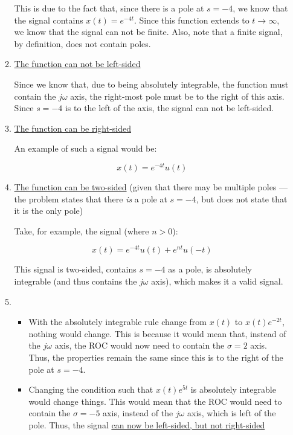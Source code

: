 \begin{enumerate}
\begin{enumerate}
        This is due to the fact that, since there is a pole at $s=-4$, we know that the signal contains $x(t)=e^{-4t}$. Since this function extends to $t\to\infty$, we know that the signal can not be finite. Also, note that a finite signal, by definition, does not contain poles.

      \item \underline{The function can not be left-sided}

        Since we know that, due to being absolutely integrable, the function must contain the $j \omega$ axis, the right-most pole must be to the right of this axis. Since $s=-4$ is to the left of the axis, the signal can not be left-sided.

      \item \underline{The function can be right-sided}

        An example of such a signal would be:

        $$\boxed{x(t)=e^{-4t}u(t)}$$

      \item \underline{The function can be two-sided} (given that there may be multiple poles — the problem states that there \textit{is} a pole at $s=-4$, but does not state that it is the only pole)

        Take, for example, the signal (where $n>0$):

        $$x(t)=e^{-4t}u(t)+e^{nt}u(-t)$$

        This signal is two-sided, contains $s=-4$ as a pole, is absolutely integrable (and thus contains the $j\omega$ axis), which makes it a valid signal.

      \item 

        \begin{itemize}

          \item With the absolutely integrable rule change from $x(t)$ to $x(t)e^{-2t}$, nothing would change. This is because it would mean that, instead of the $j\omega$ axis, the ROC would now need to contain the $\sigma=2$ axis. Thus, the properties remain the same since this is to the right of the pole at $s=-4$.

          \item Changing the condition such that $x(t)e^{5t}$ is absolutely integrable would change things. This would mean that the ROC would need to contain the $\sigma=-5$ axis, instead of the $j\omega$ axis, which is left of the pole. Thus, the signal \underline{can now be left-sided, but not right-sided}


\end{itemize}
\end{enumerate}
\end{enumerate}
